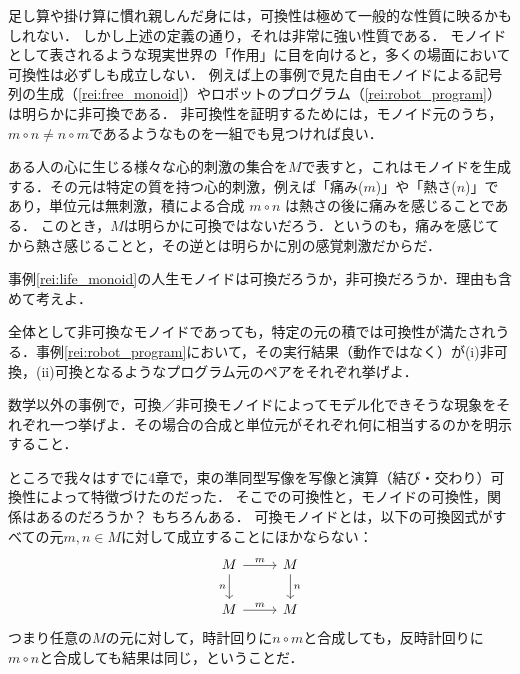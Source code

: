 \documentclass[11pt,a4paper, dvipdfmx]{jsarticle}
\begin{document}
足し算や掛け算に慣れ親しんだ身には，可換性は極めて一般的な性質に映るかもしれない．
しかし上述の定義の通り，それは非常に強い性質である．
モノイドとして表されるような現実世界の「作用」に目を向けると，多くの場面において可換性は必ずしも成立しない．
例えば上の事例で見た自由モノイドによる記号列の生成（\ref{rei:free_monoid}）やロボットのプログラム（\ref{rei:robot_program}）は明らかに非可換である．
非可換性を証明するためには，モノイド元のうち，$m \circ n \neq n \circ m$であるようなものを一組でも見つければ良い．


\begin{rei}{}{}
    ある人の心に生じる様々な心的刺激の集合を$M$で表すと，これはモノイドを生成する．その元は特定の質を持つ心的刺激，例えば「痛み($m$)」や「熱さ($n$)」であり，単位元は無刺激，積による合成 $m \circ n$ は熱さの後に痛みを感じることである．
    このとき，$M$は明らかに可換ではないだろう．というのも，痛みを感じてから熱さ感じることと，その逆とは明らかに別の感覚刺激だからだ．
\end{rei}

\begin{renshu}{}{}
    事例\ref{rei:life_monoid}の人生モノイドは可換だろうか，非可換だろうか．理由も含めて考えよ．
\end{renshu}

\begin{renshu}{}{}
 全体として非可換なモノイドであっても，特定の元の積では可換性が満たされうる．事例\ref{rei:robot_program}において，その実行結果（動作ではなく）が(i)非可換，(ii)可換となるようなプログラム元のペアをそれぞれ挙げよ．
\end{renshu}

\begin{renshu}{}{}    
    数学以外の事例で，可換／非可換モノイドによってモデル化できそうな現象をそれぞれ一つ挙げよ．その場合の合成と単位元がそれぞれ何に相当するのかを明示すること．
\end{renshu}    

ところで我々はすでに4章で，束の準同型写像を写像と演算（結び・交わり）可換性によって特徴づけたのだった．
そこでの可換性と，モノイドの可換性，関係はあるのだろうか？
もちろんある．
可換モノイドとは，以下の可換図式がすべての元$m,n \in M$に対して成立することにほかならない：
\[
\begin{tikzcd}
M \arrow{r}{m} \arrow[swap]{d}{n} 
& M \arrow{d}{n} \\
M \arrow{r}{m} & M
\end{tikzcd}
\]
つまり任意の$M$の元に対して，時計回りに$n \circ m$と合成しても，反時計回りに$m \circ n$と合成しても結果は同じ，ということだ．
\end{document}
